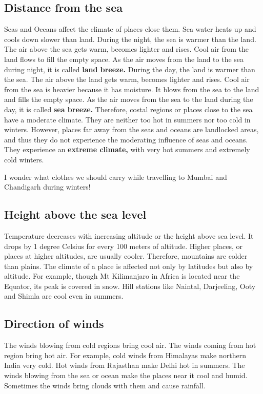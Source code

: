 \subsection{\textbf{Distance from the sea}}
Seas and Oceans affect the climate of places close them. Sea water heats up and cools down slower than land. During the night, the sea is warmer than the land. The air above the sea gets warm, becomes lighter and rises. Cool air from the land flows to fill the empty space. As the air moves from the land to the sea during night, it is called \textbf{land breeze.} During the day, the land is warmer than the sea. The air above the land gets warm, becomes lighter and rises. Cool air from the sea is heavier because it has moisture. It blows from the sea to the land and fills the empty space. As the air moves from the sea to the land during the day, it is called \textbf{sea breeze.} Therefore, costal regions or places close to the sea have a moderate climate. They are neither too hot in summers nor too cold in winters. However, places far away from the seas and oceans are landlocked areas, and thus they do not experience the moderating influence of seas and oceans. They experience an \textbf{extreme climate,} with very hot summers and extremely cold winters.
\vspace{0.1in}
\par
I wonder what clothes we should carry while travelling to Mumbai and Chandigarh during winters!
\subsection{\textbf{Height above the sea level}}
Temperature decreases with increasing altitude or the height above sea level. It drops by 1 degree Celsius for every 100 meters of altitude. Higher places, or places at higher altitudes, are usually cooler. Therefore, mountains are colder than plains. The climate of a place is affected not only by latitudes but also by altitude. For example, though Mt Kilimanjaro in Africa is located near the Equator, its peak is covered in snow. Hill stations like Naintal, Darjeeling, Ooty and Shimla are cool even in summers.
\subsection{\textbf{Direction of winds}}
The winds blowing from cold regions bring cool air. The winds coming from hot region bring hot air. For example, cold winds from Himalayas make northern India very cold. Hot winds from Rajasthan make Delhi hot in summers. The winds blowing from the sea or ocean make the places near it cool and humid. Sometimes the winds bring clouds with them and cause rainfall.
